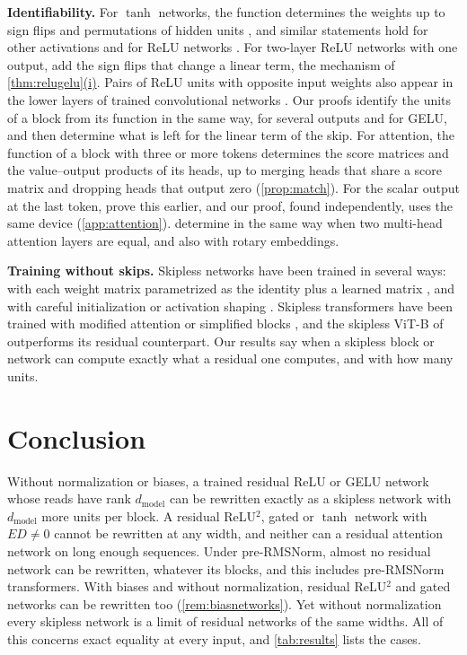 \documentclass[10pt]{article}
\theoremstyle{definition}
\theoremstyle{remark}
\newcommand{\dm}{d_{\mathrm{model}}}
\newcommand{\para}[1]{\smallskip\noindent\textbf{#1}\hspace{0.5em}}
\DeclareRobustCommand{\cpref}[2]{\hyperref[#1:#2]{\cref*{#1}(#2)}}
\begin{document}
\para{Identifiability.} For $\tanh$ networks, the function determines the weights up to sign flips and permutations of hidden units \citep{sussmann1992,fefferman1994}, and similar statements hold for other activations \citep{vlacic2019identifiability} and for ReLU networks \citep{rolnick2020reverse,buithimai2020functional,grillo2026most}. For two-layer ReLU networks with one output, \citet{petzka2020symmetries} add the sign flips that change a linear term, the mechanism of \cpref{thm:relugelu}{i}. Pairs of ReLU units with opposite input weights also appear in the lower layers of trained convolutional networks \citep{shang2016crelu}. Our proofs identify the units of a block from its function in the same way, for several outputs and for GELU, and then determine what is left for the linear term of the skip. For attention, the function of a block with three or more tokens determines the score matrices and the value--output products of its heads, up to merging heads that share a score matrix and dropping heads that output zero (\cref{prop:match}). For the scalar output at the last token, \citet[Proposition~3.1]{kim2026provably} prove this earlier, and our proof, found independently, uses the same device (\cref{app:attention}). \citet{tran2025equivariant} determine in the same way when two multi-head attention layers are equal, and \citet{tran2026equivalence} also with rotary embeddings.

\para{Training without skips.} Skipless networks have been trained in several ways: with each weight matrix parametrized as the identity plus a learned matrix \citep{zagoruyko2017diracnets}, and with careful initialization or activation shaping \citep{martens2021dks,zhang2022rectifiers}. Skipless transformers have been trained with modified attention \citep{he2023shortcuts,noci2023shaped} or simplified blocks \citep{he2024simplifying}, and the skipless ViT-B of \citet{ji2026cutting} outperforms its residual counterpart. Our results say when a skipless block or network can compute exactly what a residual one computes, and with how many units.

\section{Conclusion}\label{sec:conclusion}

Without normalization or biases, a trained residual ReLU or GELU network whose reads have rank $\dm$ can be rewritten exactly as a skipless network with $\dm$ more units per block. A residual ReLU$^2$, gated or $\tanh$ network with $ED \neq 0$ cannot be rewritten at any width, and neither can a residual attention network on long enough sequences. Under pre-RMSNorm, almost no residual network can be rewritten, whatever its blocks, and this includes pre-RMSNorm transformers. With biases and without normalization, residual ReLU$^2$ and gated networks can be rewritten too (\cref{rem:biasnetworks}). Yet without normalization every skipless network is a limit of residual networks of the same widths. All of this concerns exact equality at every input, and \cref{tab:results} lists the cases.
\end{document}
